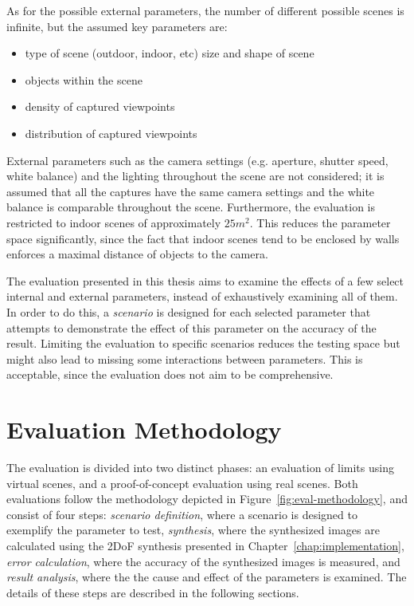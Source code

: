 As for the possible external parameters, the number of different possible scenes is infinite, but the assumed key parameters are:
\begin{itemize}
  \item type of scene (outdoor, indoor, etc) \ar size and shape of scene
  \item objects within the scene
  \item density of captured viewpoints
  \item distribution of captured viewpoints
\end{itemize}

External parameters such as the camera settings (e.g. aperture, shutter speed, white balance) and the lighting throughout the scene are not considered; it is assumed that all the captures have the same camera settings and the white balance is comparable throughout the scene. Furthermore, the evaluation is restricted to indoor scenes of approximately $25m^2$. This reduces the parameter space significantly, since the fact that indoor scenes tend to be enclosed by walls enforces a maximal distance of objects to the camera.

The evaluation presented in this thesis aims to examine the effects of a few select internal and external parameters, instead of exhaustively examining all of them. In order to do this, a \emph{scenario} is designed for each selected parameter that attempts to demonstrate the effect of this parameter on the accuracy of the result. Limiting the evaluation to specific scenarios reduces the testing space but might also lead to missing some interactions between parameters. This is acceptable, since the evaluation does not aim to be comprehensive. 


\section{Evaluation Methodology} \label{sec:eval_methodology}
The evaluation is divided into two distinct phases: an evaluation of limits using virtual scenes, and a proof-of-concept evaluation using real scenes. Both evaluations follow the methodology depicted in Figure~\ref{fig:eval-methodology}, and consist of four steps: \emph{scenario definition}, where a scenario is designed to exemplify the parameter to test, \emph{synthesis}, where the synthesized images are calculated using the 2DoF synthesis presented in Chapter~\ref{chap:implementation}, \emph{error calculation}, where the accuracy of the synthesized images is measured, and \emph{result analysis}, where the the cause and effect of the parameters is examined. The details of these steps are described in the following sections.


